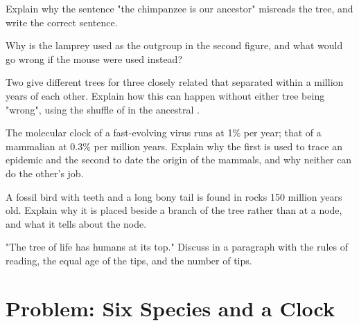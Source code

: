 \begin{exercise}[$\star\star$]\label{exo:g12:phylogenetic-trees:10}
Explain why the sentence "the chimpanzee is our ancestor" misreads the
tree, and write the correct sentence.
\end{exercise}

\begin{exercise}[$\star\star$]\label{exo:g12:phylogenetic-trees:11}
Why is the lamprey used as the outgroup in the second figure, and what
would go wrong if the mouse were used instead?
\end{exercise}

\begin{exercise}[$\star\star\star$]\label{exo:g12:phylogenetic-trees:12}
Two  give different trees for three closely related  that
separated within a million years of each other. Explain how this can
happen without either tree being "wrong", using the shuffle of
 in the ancestral .
\end{exercise}

\begin{exercise}[$\star\star\star$]\label{exo:g12:phylogenetic-trees:13}
The molecular clock of a fast-evolving virus runs at 1\% per year;
that of a mammalian  at 0.3\% per million years. Explain why the
first is used to trace an epidemic and the second to date the origin
of the mammals, and why neither can do the other's job.
\end{exercise}

\begin{exercise}[$\star\star\star$]\label{exo:g12:phylogenetic-trees:14}
A fossil bird with teeth and a long bony tail is found in rocks 150
million years old. Explain why it is placed beside a branch of the
tree rather than at a node, and what it tells about the node.
\end{exercise}

\begin{exercise}[$\star\star\star$]\label{exo:g12:phylogenetic-trees:15}
"The tree of life has humans at its top." Discuss in a paragraph with
the rules of reading, the equal age of the tips, and the number of
tips.
\end{exercise}

\section{Problem: Six Species and a Clock}

